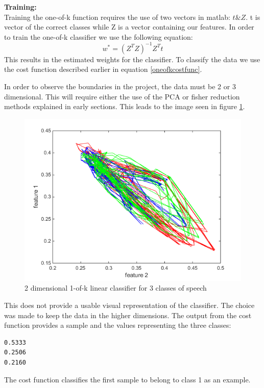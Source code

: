 \textbf{Training:}\\
Training the one-of-k function requires the use of two vectors in matlab: $t \& Z$. t is vector of the correct classes while Z is a vector containing our features. In order to train the one-of-k classifier we use the following equation:
\begin{equation}
w^* = (Z^T Z)^{-1} Z^T t
\end{equation}
This results in the estimated weights for the classifier. To classify the data we use the cost function described earlier in equation \ref{oneofkcostfunc}.

In order to observe the boundaries in the project, the data must be 2 or 3 dimensional. This will require either the use of the PCA or fisher reduction methods explained in early sections. This leads to the image seen in figure \ref{2dimoneofk}.
\begin{figure}[H]
\centering
\includegraphics[scale=0.5]{billeder/2dimoneofk}
\caption{2 dimensional 1-of-k linear classifier for 3 classes of speech}
\label{2dimoneofk}
\end{figure}
This does not provide a usable visual representation of the classifier. The choice was made to keep the data in the higher dimensions. The output from the cost function provides a sample and the values representing the three classes:
\begin{verbatim}
0.5333
0.2506
0.2160
\end{verbatim}
The cost function classifies the first sample to belong to class 1 as an example.

